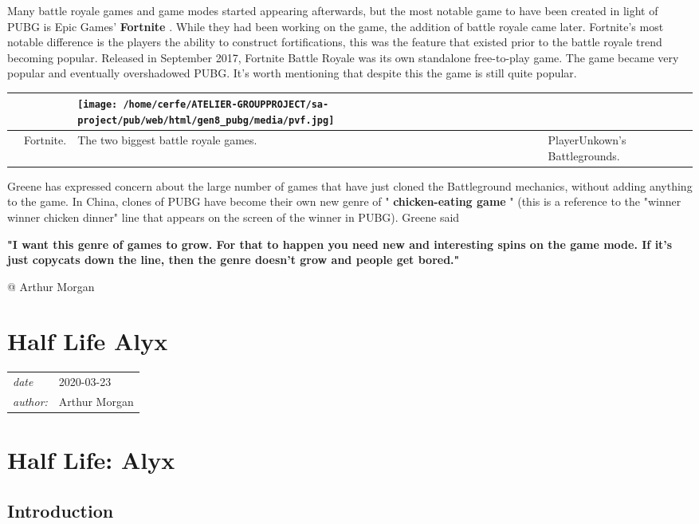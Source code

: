 \documentclass[a4paper,10pt]{book}
\newcommand{\pageHeader}[4]{
    \section{#1}
    \vspace{-0.3cm}
    \begin{table}[h!]
     \begin{tabular}{ll}
        \hline
        \textit{date} & #2 \\
        \textit{author: } & #3\\
        \hline
     \end{tabular}
    \end{table}
    \vspace{-0.3cm}
}
\begin{document}
 
        Many battle royale games and game modes started appearing afterwards, but the most notable game to have been created in light of PUBG is Epic Games'  \textbf{Fortnite } . While they had been working on the game, the addition of battle royale came later. Fortnite's most notable difference is the players the ability to construct fortifications, this was the feature that existed prior to the battle royale trend becoming popular. Released in September 2017,
         Fortnite Battle Royale  was its own standalone free-to-play game. The game became very popular and eventually overshadowed PUBG. It's worth mentioning that despite this the game is still quite popular.
       
 \begin{longtable}{p{1mm}|l|l|l|}\hline
 
 & 
 & \texttt{[image: /home/cerfe/ATELIER-GROUPPROJECT/sa-project/pub/web/html/gen8\_pubg/media/pvf.jpg]}
 & 
 \\\hline
 
 & Fortnite. 
 & The two biggest battle royale games. 
 & PlayerUnkown's Battlegrounds. 
 \\\hline
 \end{longtable}
 
        Greene has expressed concern about the large number of games that have just cloned the Battleground mechanics, without adding anything to the game. In China, clones of PUBG have become their own new genre of " \textbf{chicken-eating game } " (this is a reference to the "winner winner chicken dinner" line that appears on the screen of the winner in PUBG). Greene said
       
 
 \textbf{
          "I want this genre of games to grow. For that to happen you need new and interesting spins on the game mode. If it's just copycats down the line, then the genre doesn't grow and people get bored."
         } 
 
 
 
          @ Arthur Morgan
       
 
 
 \newpage\pageHeader{Half Life Alyx}{2020-03-23}{Arthur Morgan}{VR's first killer app, Half Life: Alyx}
 \section{Half Life: Alyx }
 \subsection{Introduction }
 
\end{document}
